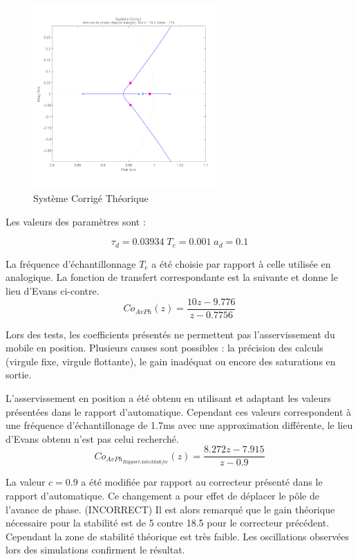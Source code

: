 \documentclass[11pt, french]{article} %
\begin{document}
\begin{figure}

	\includegraphics[width = 7cm,trim=0 1.4cm 0 0.7cm ,clip=true]
					{SolutionNumerique/SystemeCorrigeThorique.pdf}
	\caption{Système Corrigé Théorique}
	\vspace{1cm}
\end{figure}
Les valeurs des paramètres sont :

\[\tau_d=0.03934 \; T_e=0.001 \; a_d=0.1\]

La fréquence d'échantillonnage $T_e$ a été choisie par rapport à celle utilisée en analogique. La fonction de transfert correspondante est la suivante et donne le lieu d'Evans ci-contre.
\[Co_{AvPh}(z)=\dfrac{10 z - 9.776}{z -0.7756}\]

Lors des tests, les coefficients présentés ne permettent pas l'asservissement du mobile en position. Plusieurs causes sont possibles : la précision des calculs (virgule fixe, virgule flottante), le gain inadéquat ou encore des saturations en sortie.

L'asservissement en position a été obtenu en utilisant et adaptant les valeurs présentées dans le rapport d'automatique. Cependant ces valeurs correspondent à une fréquence d'échantillonage de 1.7ms avec une approximation différente, le lieu d'Evans obtenu n'est pas celui recherché.
\[  Co_{AvPh_{Rapport Auto Modifie}}(z) = \dfrac {8.272z - 7.915} {z - 0.9} \]

La valeur $c=0.9$ a été modifiée par rapport au correcteur présenté dans le rapport d'automatique. Ce changement a pour effet de déplacer le pôle de l'avance de phase. (INCORRECT) Il est alors remarqué que le gain théorique nécessaire pour la stabilité est de 5 contre 18.5 pour le correcteur précédent. Cependant la zone de stabilité théorique est très faible. Les oscillations observées lors des simulations confirment le résultat.
\end{document}
